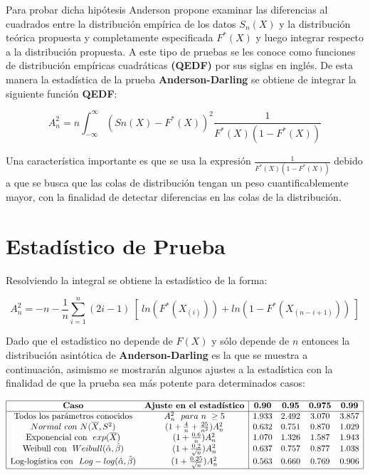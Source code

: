 \documentclass[
  a4paper,
  oneside,
  openany]{book}
\begin{document}
Para probar dicha hipótesis Anderson propone examinar las diferencias al cuadrados entre la distribución empírica de los datos \(S_{n}(X)\) y la distribución teórica propuesta y completamente
especificada \(F^*(X)\) y luego integrar respecto a la distribución propuesta.
A este tipo de pruebas se les conoce como funciones de distribución empíricas cuadráticas \textbf{(QEDF)} por
sus siglas en inglés.
De esta manera la estadística de la prueba \textbf{Anderson-Darling} se obtiene de integrar la
siguiente función \textbf{QEDF}:

\[A_n^2=n \int_{-\infty}^{\infty} (Sn(X)-F^*(X))^2 \frac{1}{F^*(X)(1-F^*(X))}\]

Una característica importante es que se usa la expresión \(\frac{1}{F^*(X)(1-F^*(X))}\)
debido a que se busca que las colas de distribución tengan un peso cuantificablemente mayor, con la finalidad de detectar diferencias en las colas de la distribución.

\hypertarget{estaduxedstico-de-prueba-16}{%
\section{Estadístico de Prueba}\label{estaduxedstico-de-prueba-16}}

Resolviendo la integral se obtiene la estadístico de la forma:

\[A_n^2=-n-\frac{1}{n}\sum_{i=1}^{n}\left(2i-1\right) \ [ \ ln(F^*(X_{(i)})) +ln(1-F^*(X_{(n-i+1)})) \ ]\]

Dado que el estadístico no depende de \(F(X)\) y sólo depende de \(n\) entonces la distribución
asintótica de \textbf{Anderson-Darling} es la que se muestra a continuación, asimismo se mostrarán algunos
ajustes a la estadística con la finalidad de que la prueba sea más potente para determinados
casos:

\[
\begin{array}{|c c| c c c c|}
\hline
\textbf{Caso} & \textbf{Ajuste en el estadístico} &\textbf{0.90} &\textbf{0.95} & \textbf{0.975} & \textbf{0.99} \\
\hline
\mbox{Todos los parámetros conocidos} & A_{n}^{2} \ \ para\ n\ \geq 5 & 1.933 & 2.492 & 3.070 & 3.857 \\
Normal\ con\ N(\overline{X},S^2) & (1+\frac{4}{n}+\frac{25}{n^2})A_{n}^{2} & 0.632 & 0.751 & 0.870 & 1.029 \\
\mbox{Exponencial con} \ \ exp(\overline{X}) & (1+\frac{0.6}{n})A_{n}^{2} & 1.070 & 1.326 & 1.587 & 1.943 \\
\mbox{Weibull con} \ \ Weibull(\hat{\alpha},\hat{\beta}) & (1+\frac{0.2}{\sqrt{n}})A_{n}^{2} & 0.637 & 0.757 & 0.877 & 1.038 \\
\mbox{Log-logística con} \ \ Log-log(\hat{\alpha},\hat{\beta}) & (1+\frac{0.25}{\sqrt{n}})A_{n}^{2} & 0.563 & 0.660 & 0.769 & 0.906 \\
\hline
\end{array}
\]
\end{document}
